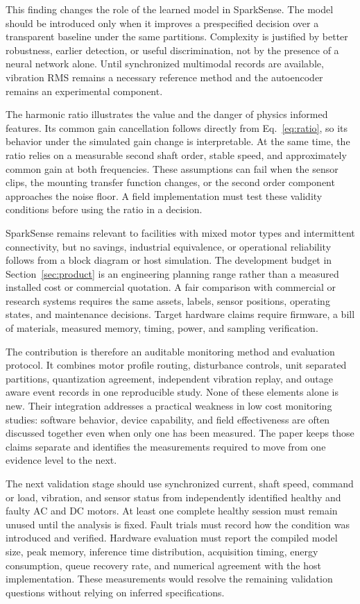 \documentclass[10pt,twocolumn]{article}
\begin{document}
This finding changes the role of the learned model in SparkSense. The model should be introduced only when it improves a prespecified decision over a transparent baseline under the same partitions. Complexity is justified by better robustness, earlier detection, or useful discrimination, not by the presence of a neural network alone. Until synchronized multimodal records are available, vibration RMS remains a necessary reference method and the autoencoder remains an experimental component.

The harmonic ratio illustrates the value and the danger of physics informed features. Its common gain cancellation follows directly from Eq.~\eqref{eq:ratio}, so its behavior under the simulated gain change is interpretable. At the same time, the ratio relies on a measurable second shaft order, stable speed, and approximately common gain at both frequencies. These assumptions can fail when the sensor clips, the mounting transfer function changes, or the second order component approaches the noise floor. A field implementation must test these validity conditions before using the ratio in a decision.

SparkSense remains relevant to facilities with mixed motor types and intermittent connectivity, but no savings, industrial equivalence, or operational reliability follows from a block diagram or host simulation. The development budget in Section~\ref{sec:product} is an engineering planning range rather than a measured installed cost or commercial quotation. A fair comparison with commercial or research systems requires the same assets, labels, sensor positions, operating states, and maintenance decisions. Target hardware claims require firmware, a bill of materials, measured memory, timing, power, and sampling verification.

The contribution is therefore an auditable monitoring method and evaluation protocol. It combines motor profile routing, disturbance controls, unit separated partitions, quantization agreement, independent vibration replay, and outage aware event records in one reproducible study. None of these elements alone is new. Their integration addresses a practical weakness in low cost monitoring studies: software behavior, device capability, and field effectiveness are often discussed together even when only one has been measured. The paper keeps those claims separate and identifies the measurements required to move from one evidence level to the next.

The next validation stage should use synchronized current, shaft speed, command or load, vibration, and sensor status from independently identified healthy and faulty AC and DC motors. At least one complete healthy session must remain unused until the analysis is fixed. Fault trials must record how the condition was introduced and verified. Hardware evaluation must report the compiled model size, peak memory, inference time distribution, acquisition timing, energy consumption, queue recovery rate, and numerical agreement with the host implementation. These measurements would resolve the remaining validation questions without relying on inferred specifications.
\end{document}
